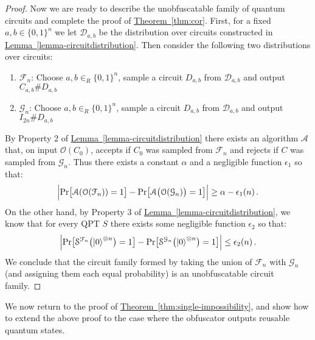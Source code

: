 \documentclass[envcountsame]{llncs}
\numberwithin{equation}{section}
\newcommand{\expref}[2]{\texorpdfstring{\hyperref[#2]{#1~\ref{#2}}}{#1~\ref{#2}}}
\newcommand{\algo}{\mathcal}
\newcommand{\inrand}{\in_R}
\begin{document}
\begin{proof}
Now we are ready to describe the unobfuscatable family of quantum circuits and complete the proof of \expref{Theorem}{thm:cor}. First, for a fixed $a,b \in \{0, 1\}^n$ we let $\mathcal{D}_{a,b}$ be the distribution over circuits constructed in \expref{Lemma}{lemma-circuitdistribution}. Then consider the following two distributions over circuits: 
\begin{enumerate}
\item $\mathcal{F}_{n}$: Choose $a,b \inrand \{0,1\}^n$,  sample a circuit $D_{a, b}$ from $\mathcal{D}_{a,b}$ and output $C_{a,b}\# D_{a,b}$ 
\item $\mathcal{G}_{n}$: Choose $a,b \inrand \{0,1\}^n$,  sample a circuit $D_{a, b}$ from $\mathcal{D}_{a,b}$ and output $I_{2n}\# D_{a,b}$
\end{enumerate}
By Property 2 of \expref{Lemma}{lemma-circuitdistribution} there exists an algorithm $\algo{A}$ that, on input $\mathcal{O}(C_0)$, accepts if $C_0$ was sampled from $\algo{F}_n$ and rejects if $C$ was sampled from $\algo{G}_n$.  Thus there exists a constant $\alpha$ and a negligible function $\epsilon_1$ so that:
$$
\Bigl| \text{Pr}\bigl[\mathcal A(\mathcal{O}(\mathcal{F}_n)) = 1\bigr]
- \text{Pr}\bigl[\mathcal A\bigl(\mathcal{O}(\mathcal{G}_n)\bigr) = 1\bigr] \Bigr| 
\geq \alpha-\epsilon_1(n)\,.
$$
On the other hand, by Property 3 of \expref{Lemma}{lemma-circuitdistribution}, we know that for every QPT $S$ there exists some negligible function $\epsilon_2$ so that: 
$$
\Bigl| \text{Pr}\bigl[\mathcal S^{\mathcal{F}_n}\bigl({\left\vert{0}\right\rangle}^{\otimes n}\bigr) = 1\bigr]
- \text{Pr}\bigl[\mathcal S^{\mathcal{G}_n}\bigl({\left\vert{0}\right\rangle}^{\otimes n}\bigr) = 1\bigr] \Bigr| 
\leq \epsilon_2(n)\,.
$$
We conclude that the circuit family formed by taking the union of $\mathcal F_n$ with $\mathcal G_n$ (and assigning them each equal probability) is an unobfuscatable circuit family.
\end{proof}

We now return to the proof of \expref{Theorem}{thm:single-impossibility}, and show how to extend the above proof to the case where the obfuscator outputs reusable quantum states.
\end{document}
